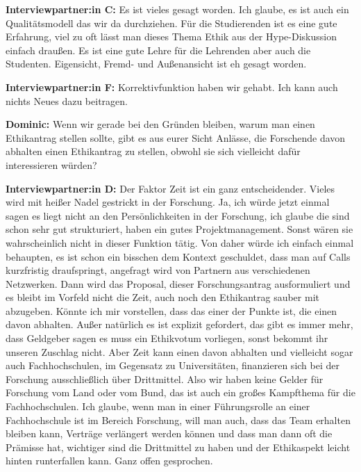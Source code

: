 \documentclass[a4paper,12pt,twoside]{scrreprt}
\begin{document}
\textbf{Interviewpartner:in C:} Es ist vieles gesagt worden. Ich glaube, es ist auch ein Qualitätsmodell das wir da durchziehen. Für die Studierenden ist es eine gute Erfahrung, viel zu oft lässt man dieses Thema Ethik aus der Hype-Diskussion einfach draußen. Es ist eine gute Lehre für die Lehrenden aber auch die Studenten. Eigensicht, Fremd- und Außenansicht ist eh gesagt worden.

\textbf{Interviewpartner:in F:} Korrektivfunktion haben wir gehabt. Ich kann auch nichts Neues dazu beitragen.

\textbf{Dominic:} Wenn wir gerade bei den Gründen bleiben, warum man einen Ethikantrag stellen sollte, gibt es aus eurer Sicht Anlässe, die Forschende davon abhalten einen Ethikantrag zu stellen, obwohl sie sich vielleicht dafür interessieren würden?

\textbf{Interviewpartner:in D:} Der Faktor Zeit ist ein ganz entscheidender. Vieles wird mit heißer Nadel gestrickt in der Forschung. Ja, ich würde jetzt einmal sagen es liegt nicht an den Persönlichkeiten in der Forschung, ich glaube die sind schon sehr gut strukturiert, haben ein gutes Projektmanagement. Sonst wären sie wahrscheinlich nicht in dieser Funktion tätig. Von daher würde ich einfach einmal behaupten, es ist schon ein bisschen dem Kontext geschuldet, dass man auf Calls kurzfristig draufspringt, angefragt wird von Partnern aus verschiedenen Netzwerken. Dann wird das Proposal, dieser Forschungsantrag ausformuliert und es bleibt im Vorfeld nicht die Zeit, auch noch den Ethikantrag sauber mit abzugeben. Könnte ich mir vorstellen, dass das einer der Punkte ist, die einen davon abhalten. Außer natürlich es ist explizit gefordert, das gibt es immer mehr, dass Geldgeber sagen es muss ein Ethikvotum vorliegen, sonst bekommt ihr unseren Zuschlag nicht. Aber Zeit kann einen davon abhalten und vielleicht sogar auch Fachhochschulen, im Gegensatz zu Universitäten, finanzieren sich bei der Forschung ausschließlich über Drittmittel. Also wir haben keine Gelder für Forschung vom Land oder vom Bund, das ist auch ein großes Kampfthema für die Fachhochschulen. Ich glaube, wenn man in einer Führungsrolle an einer Fachhochschule ist im Bereich Forschung, will man auch, dass das Team erhalten bleiben kann, Verträge verlängert werden können und dass man dann oft die Prämisse hat, wichtiger sind die Drittmittel zu haben und der Ethikaspekt leicht hinten runterfallen kann. Ganz offen gesprochen.
\end{document}
